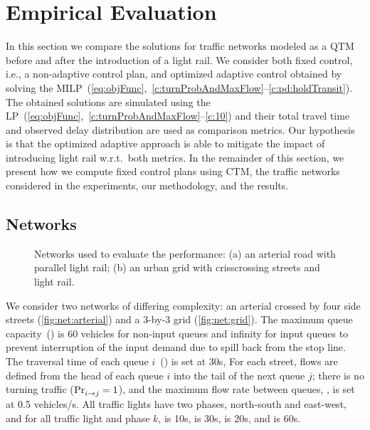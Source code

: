 \section{Empirical Evaluation}
  
In this section we compare the solutions for traffic networks modeled as a QTM
before and after the introduction of a light rail.
%
We consider both fixed control, i.e., a non-adaptive control plan, and optimized
adaptive control obtained by solving the
MILP~(\ref{eq:objFunc},~\ref{c:turnProbAndMaxFlow}--\ref{c:pd:holdTransit}).
%
The obtained solutions are simulated using the
LP~(\ref{eq:objFunc},~\ref{c:turnProbAndMaxFlow}--\ref{c:10}) and their total
travel time and observed delay distribution are used as comparison metrics.
%
Our hypothesis is that the optimized adaptive approach is able to mitigate the
impact of introducing light rail w.r.t.\ both metrics.
%
In the remainder of this section, we present how we compute fixed control plans
using CTM, the traffic networks considered in the experiments, our methodology,
and the results.






\subsection{Networks}

\begin{figure}[t!]
\centering
\caption{Networks used to evaluate the performance:
  (a) an arterial road with parallel light rail;
  (b) an urban grid with crisscrossing streets and light rail.
%
}
\label{fig:networks}
\end{figure}



We consider two networks of differing complexity: an arterial crossed by four
side streets (\cref{fig:net:arterial}) and a 3-by-3 grid (\cref{fig:net:grid}).
%
%
The maximum queue capacity~() is 60 vehicles for non-input queues and
infinity for input queues to prevent interruption of the input demand due to
spill back from the stop line. 
%
The traversal time of each queue $i$~() is set at 30s,
%
For each street, flows are defined from the head of each queue $i$ into the tail
of the next queue $j$;
%
there is no turning traffic ($\mathrm{Pr}_{i\to j}^{\mathrm{}}=1$), and the maximum flow rate
between queues, , is set at 0.5 vehicles/s.
%
All traffic lights have two phases, north-south and east-west, and for all
traffic light \tl and phase $k$,  is 10s,  is 30s,
\CTMIN{\tl} is 20s, and \CTMAX{\tl} is 60s.

